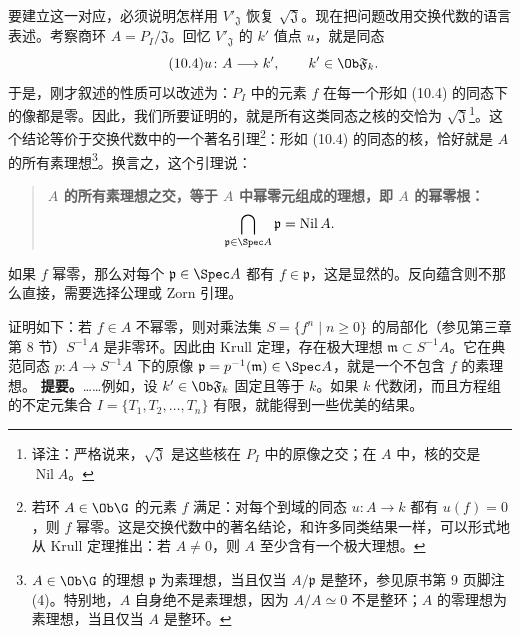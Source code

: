 要建立这一对应，必须说明怎样用 $V'_{\mathfrak J}$ 恢复 $\sqrt{\mathfrak J}$。现在把问题改用交换代数的语言表述。考察商环 $A=P_I/\mathfrak J$。回忆 $V'_{\mathfrak J}$ 的 $k'$ 值点 $u$，就是同态
\begin{equation}\tag{10.4}u\colon A\longrightarrow k',\qquad k'\in\Ob\mathfrak F_k.
\end{equation}
于是，刚才叙述的性质可以改述为：$P_I$ 中的元素 $f$ 在每一个形如 (10.4) 的同态下的像都是零。因此，我们所要证明的，就是所有这类同态之核的交恰为 $\sqrt{\mathfrak J}$\footnote{译注：严格说来，$\sqrt{\mathfrak J}$ 是这些核在 $P_I$ 中的原像之交；在 $A$ 中，核的交是 $\operatorname{Nil}A$。}。这个结论等价于交换代数中的一个著名引理\footnote{若环 $A\in\Ob\G$ 的元素 $f$ 满足：对每个到域的同态 $u\colon A\to k$ 都有 $u(f)=0$，则 $f$ 幂零。这是交换代数中的著名结论，和许多同类结果一样，可以形式地从 Krull 定理推出：若 $A\ne0$，则 $A$ 至少含有一个极大理想。}：形如 (10.4) 的同态的核，恰好就是 $A$ 的所有素理想\footnote{$A\in\Ob\G$ 的理想 $\mathfrak p$ 为素理想，当且仅当 $A/\mathfrak p$ 是整环，参见原书第 9 页脚注 (4)。特别地，$A$ 自身绝不是素理想，因为 $A/A\simeq0$ 不是整环；$A$ 的零理想为素理想，当且仅当 $A$ 是整环。}。换言之，这个引理说：
\begin{quote}\bfseries $A$ 的所有素理想之交，等于 $A$ 中幂零元组成的理想，即 $A$ 的幂零根：
\[\bigcap_{\mathfrak p\in\Spec A}\mathfrak p=\operatorname{Nil}A.\]
\end{quote}
如果 $f$ 幂零，那么对每个 $\mathfrak p\in\Spec A$ 都有 $f\in\mathfrak p$，这是显然的。反向蕴含则不那么直接，需要选择公理或 Zorn 引理。

证明如下：若 $f\in A$ 不幂零，则对乘法集 $S=\{f^n\mid n\geq0\}$ 的局部化（参见第三章第 8 节）$S^{-1}A$ 是非零环。因此由 Krull 定理，存在极大理想 $\mathfrak m\subset S^{-1}A$。它在典范同态 $p\colon A\to S^{-1}A$ 下的原像 $\mathfrak p=p^{-1}(\mathfrak m)\in\Spec A$，就是一个不包含 $f$ 的素理想。
\textbf{提要。}……例如，设 $k'\in\Ob\mathfrak F_k$ 固定且等于 $k$。如果 $k$ 代数闭，而且方程组的不定元集合 $I=\{T_1,T_2,\ldots,T_n\}$ 有限，就能得到一些优美的结果。

